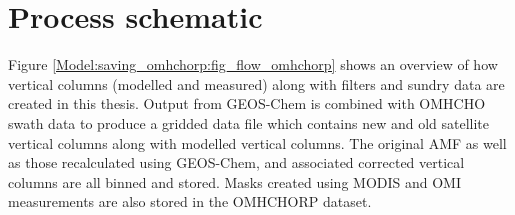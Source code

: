   
\section{Process schematic}
  \label{Model:saving_omhchorp}
  Figure \ref{Model:saving_omhchorp:fig_flow_omhchorp} shows an overview of how vertical columns (modelled and measured) along with filters and sundry data are created in this thesis.
  Output from GEOS-Chem is combined with OMHCHO swath data to produce a gridded data file which contains new and old satellite vertical columns along with modelled vertical columns.
  The original AMF as well as those recalculated using GEOS-Chem, and associated corrected vertical columns are all binned and stored.
  Masks created using MODIS and OMI measurements are also stored in the OMHCHORP dataset.

  
     
